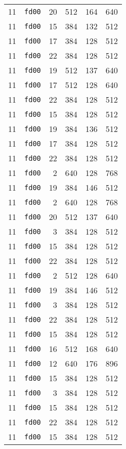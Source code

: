 \documentclass{article}
\begin{document}
\begin{table}[h!]
\begin{tabular}{llrrrl}
    11 & \texttt{fd00} & 20 & 512 & 164 & 640 \\
    11 & \texttt{fd00} & 15 & 384 & 132 & 512 \\
    11 & \texttt{fd00} & 17 & 384 & 128 & 512 \\
    11 & \texttt{fd00} & 22 & 384 & 128 & 512 \\
    11 & \texttt{fd00} & 19 & 512 & 137 & 640 \\
    11 & \texttt{fd00} & 17 & 512 & 128 & 640 \\
    11 & \texttt{fd00} & 22 & 384 & 128 & 512 \\
    11 & \texttt{fd00} & 15 & 384 & 128 & 512 \\
    11 & \texttt{fd00} & 19 & 384 & 136 & 512 \\
    11 & \texttt{fd00} & 17 & 384 & 128 & 512 \\
    11 & \texttt{fd00} & 22 & 384 & 128 & 512 \\
    11 & \texttt{fd00} & 2 & 640 & 128 & 768 \\
    11 & \texttt{fd00} & 19 & 384 & 146 & 512 \\
    11 & \texttt{fd00} & 2 & 640 & 128 & 768 \\
    11 & \texttt{fd00} & 20 & 512 & 137 & 640 \\
    11 & \texttt{fd00} & 3 & 384 & 128 & 512 \\
    11 & \texttt{fd00} & 15 & 384 & 128 & 512 \\
    11 & \texttt{fd00} & 22 & 384 & 128 & 512 \\
    11 & \texttt{fd00} & 2 & 512 & 128 & 640 \\
    11 & \texttt{fd00} & 19 & 384 & 146 & 512 \\
    11 & \texttt{fd00} & 3 & 384 & 128 & 512 \\
    11 & \texttt{fd00} & 22 & 384 & 128 & 512 \\
    11 & \texttt{fd00} & 15 & 384 & 128 & 512 \\
    11 & \texttt{fd00} & 16 & 512 & 168 & 640 \\
    11 & \texttt{fd00} & 12 & 640 & 176 & 896 \\
    11 & \texttt{fd00} & 15 & 384 & 128 & 512 \\
    11 & \texttt{fd00} & 3 & 384 & 128 & 512 \\
    11 & \texttt{fd00} & 15 & 384 & 128 & 512 \\
    11 & \texttt{fd00} & 22 & 384 & 128 & 512 \\
    11 & \texttt{fd00} & 15 & 384 & 128 & 512 \\

\end{tabular}
\end{table}
\end{document}

